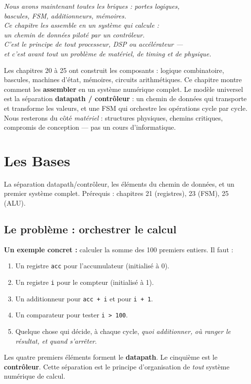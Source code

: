 \documentclass[12pt,a4paper,twoside]{book}
\begin{document}
\begin{center}
\textit{Nous avons maintenant toutes les briques : portes logiques,\\
bascules, FSM, additionneurs, mémoires.\\
Ce chapitre les assemble en un système qui calcule :\\
un chemin de données piloté par un contrôleur.\\
C'est le principe de tout processeur, DSP ou accélérateur ---\\
et c'est avant tout un problème de matériel, de timing et de physique.}
\end{center}

\vspace{0.5cm}

Les chapitres 20 à 25 ont construit les composants : logique combinatoire, bascules, machines d'état, mémoires, circuits arithmétiques. Ce chapitre montre comment les \textbf{assembler} en un système numérique complet. Le modèle universel est la séparation \textbf{datapath / contrôleur} : un chemin de données qui transporte et transforme les valeurs, et une FSM qui orchestre les opérations cycle par cycle. Nous resterons du côté \textit{matériel} : structures physiques, chemins critiques, compromis de conception --- pas un cours d'informatique.

\section{Les Bases}

\begin{bases}
La séparation datapath/contrôleur, les éléments du chemin de données, et un premier système complet. Prérequis : chapitres 21 (registres), 23 (FSM), 25 (ALU).
\end{bases}

\subsection{Le problème : orchestrer le calcul}

\begin{intuition}
\textbf{Un exemple concret :} calculer la somme des 100 premiers entiers. Il faut :
\begin{enumerate}[nosep]
\item Un registre \texttt{acc} pour l'accumulateur (initialisé à 0).
\item Un registre \texttt{i} pour le compteur (initialisé à 1).
\item Un additionneur pour \texttt{acc + i} et pour \texttt{i + 1}.
\item Un comparateur pour tester \texttt{i > 100}.
\item Quelque chose qui décide, à chaque cycle, \textit{quoi additionner, où ranger le résultat, et quand s'arrêter}.
\end{enumerate}
Les quatre premiers éléments forment le \textbf{datapath}. Le cinquième est le \textbf{contrôleur}. Cette séparation est le principe d'organisation de \textit{tout} système numérique de calcul.
\end{intuition}
\end{document}
